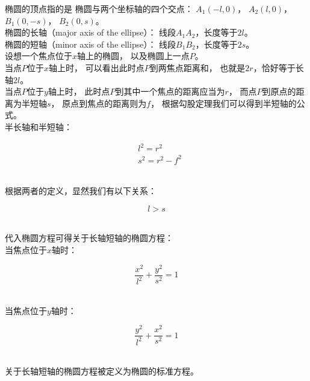 \documentclass[UTF8]{ctexart}
\begin{document}
\newpage

    椭圆的顶点指的是
    椭圆与两个坐标轴的四个交点：
    $A_1(-l,0)$，
    $A_2(l,0)$，
    $B_1(0,-s)$，
    $B_2(0,s)$。\\[3mm]
    椭圆的长轴（major axis of the ellipse）：
    线段$A_1A_2$，长度等于$2l$。\\[1mm]
    椭圆的短轴（minor axis of the ellipse）：
    线段$B_1B_2$\;，长度等于$2s$。\\[3mm]
    设想一个焦点位于$x$轴上的椭圆，
    以及椭圆上一点$P$。\\[2mm]
    当点$P$位于$x$轴上时，
    可以看出此时点$P$到两焦点距离和，
    也就是$2r$，恰好等于长轴$2l$。\\[2mm]
    当点$P$位于$y$轴上时，
    此时点$P$到其中一个焦点的距离应当为$r$，
    而点$P$到原点的距离为半短轴$s$，
    原点到焦点的距离则为$f$，
    根据勾股定理我们可以得到半短轴的公式。\\[3mm]
    半长轴和半短轴：
    \begin{large}
        \begin{align*}
            &l^2=r^2\\[3mm]
            &s^2=r^2-f^2
        \end{align*}
    \end{large}\\
    根据两者的定义，显然我们有以下关系：
    \begin{large}
        \begin{equation*}
            l>s
        \end{equation*}
    \end{large}\\
    代入椭圆方程可得关于长轴短轴的椭圆方程：\\[3mm]
    当焦点位于$x$轴时：\\
    \begin{large}
        \begin{equation*}
            \frac{x^2}{l^2}+\frac{y^2}{s^2}=1
        \end{equation*}
    \end{large}\\
    当焦点位于$y$轴时：\\
    \begin{large}
        \begin{equation*}
            \frac{y^2}{l^2}+\frac{x^2}{s^2}=1
        \end{equation*}
    \end{large}\\
    关于长轴短轴的椭圆方程被定义为椭圆的标准方程。
\end{document}

